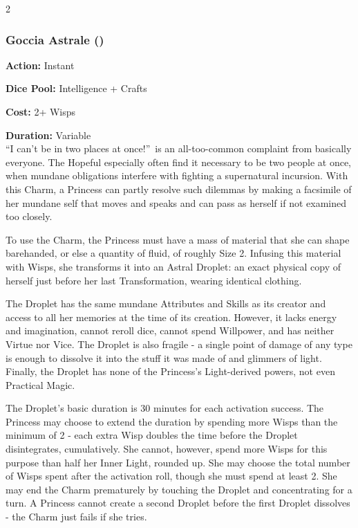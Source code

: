 \begin{multicols}{2}
\subsubsection*{Goccia Astrale (\textbullet\textbullet\textbullet)}
\noindent \textbf{Action:} Instant

\noindent \textbf{Dice Pool:} Intelligence + Crafts 

\noindent \textbf{Cost:} 2+ Wisps

\noindent \textbf{Duration:} Variable\\ 

\noindent \textquotedblleft I can't be in two places at once!\textquotedblright\, is an all-too-common complaint from basically everyone. The Hopeful especially often find it necessary to be two people at once, when mundane obligations interfere with fighting a supernatural incursion. With this Charm, a Princess can partly resolve such dilemmas by making a facsimile of her mundane self that moves and speaks and can pass as herself if not examined too closely.

To use the Charm, the Princess must have a mass of material that she can shape barehanded, or else a quantity of fluid, of roughly Size 2. Infusing this material with Wisps, she transforms it into an Astral Droplet: an exact physical copy of herself just before her last Transformation, wearing identical clothing. 

The Droplet has the same mundane Attributes and Skills as its creator and access to all her memories at the time of its creation. However, it lacks energy and imagination, cannot reroll dice, cannot spend Willpower, and has neither Virtue nor Vice. The Droplet is also fragile - a single point of damage of any type is enough to dissolve it into the stuff it was made of and glimmers of light. Finally, the Droplet has none of the Princess's Light-derived powers, not even Practical Magic.

The Droplet's basic duration is 30 minutes for each activation success. The Princess may choose to extend the duration by spending more Wisps than the minimum of 2 - each extra Wisp doubles the time before the Droplet disintegrates, cumulatively. She cannot, however, spend more Wisps for this purpose than half her Inner Light, rounded up. She may choose the total number of Wisps spent after the activation roll, though she must spend at least 2. She may end the Charm prematurely by touching the Droplet and concentrating for a turn. A Princess cannot create a second Droplet before the first Droplet dissolves - the Charm just fails if she tries.


\end{multicols}
